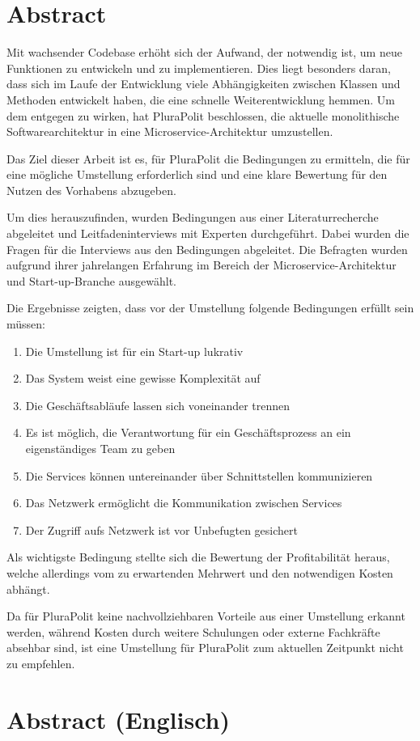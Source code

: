 \section*{Abstract}

Mit wachsender Codebase erhöht sich der Aufwand, der notwendig ist, um neue Funktionen zu entwickeln und zu implementieren. Dies liegt besonders daran, dass sich im Laufe der Entwicklung viele Abhängigkeiten zwischen Klassen und Methoden entwickelt haben, die eine schnelle Weiterentwicklung hemmen. Um dem entgegen zu wirken, hat PluraPolit beschlossen, die aktuelle monolithische Softwarearchitektur in eine Microservice-Architektur umzustellen.


Das Ziel dieser Arbeit ist es, für PluraPolit die Bedingungen zu ermitteln, die für eine mögliche Umstellung erforderlich sind und eine klare Bewertung für den Nutzen des Vorhabens abzugeben.

Um dies herauszufinden, wurden Bedingungen aus einer Literaturrecherche abgeleitet und Leitfadeninterviews mit Experten durchgeführt. Dabei wurden die Fragen für die Interviews aus den Bedingungen abgeleitet. Die Befragten wurden aufgrund ihrer jahrelangen Erfahrung im Bereich der Microservice-Architektur und Start-up-Branche ausgewählt.

Die Ergebnisse zeigten, dass vor der Umstellung folgende Bedingungen erfüllt sein müssen:
\begin{enumerate}
	\item Die Umstellung ist für ein Start-up lukrativ
	\item Das System weist eine gewisse Komplexität auf
	\item Die Geschäftsabläufe lassen sich voneinander trennen
	\item Es ist möglich, die Verantwortung für ein Geschäftsprozess an ein eigenständiges Team zu geben
	\item Die Services können untereinander über Schnittstellen kommunizieren
	\item Das Netzwerk ermöglicht die Kommunikation zwischen Services
	\item Der Zugriff aufs Netzwerk ist vor Unbefugten gesichert
\end{enumerate}

Als wichtigste Bedingung stellte sich die Bewertung der Profitabilität heraus, welche allerdings vom zu erwartenden Mehrwert und den notwendigen Kosten abhängt. 

Da für PluraPolit keine nachvollziehbaren Vorteile aus einer Umstellung erkannt werden, während Kosten durch weitere Schulungen oder externe Fachkräfte absehbar sind, ist eine Umstellung für PluraPolit zum aktuellen Zeitpunkt nicht zu empfehlen.

\newpage

\section*{Abstract (Englisch)}

